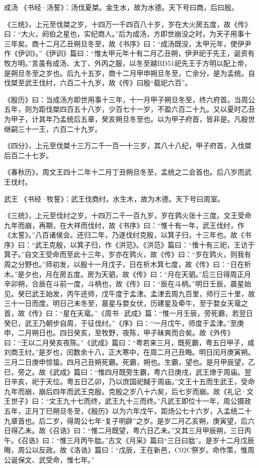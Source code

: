 \documentclass[]{article}
\begin{document}
成汤 《书经·汤誓》：汤伐夏桀。金生水，故为水德。天下号曰商，后曰殷。

《三统》，上元至伐桀之岁，十四万一千四百八十岁，岁在大火房五度，故《传》曰：``大火，阏伯之星也，实纪商人。''后为成汤，方即世崩没之时，为天子用事十三年矣。商十二月乙丑朔旦冬至，故《书序》曰：``成汤既没，太甲元年，使伊尹作《伊训》。''《伊训》篇曰：``惟太甲元年十有二月乙丑朔，伊尹祀于先王，诞资有牧方明。''言虽有成汤、太丁、外丙之服，以冬至越BD51祀先王于方明以配上帝，是朔旦冬至之岁也。后九十五岁，商十二月甲申朔旦冬至，亡余分，是为孟统。自伐桀至武王伐纣，六百二十九岁，故《传》曰殷``载祀六百''。

《殷历》曰：当成汤方即世用事十三年，十一月甲子朔旦冬至，终六府首。当周公五年，则为距伐桀四百五十八岁，少百七十一岁，不盈六百二十九。又以夏时乙丑为甲子，计其年乃孟统后五章，癸亥朔旦冬至也。以为甲子府首，皆非是。凡殷世继嗣三十一王，六百二十九岁。

《四分》，上元至伐桀十三万二千一百一十三岁，其八十八纪，甲子府首，入伐桀后百二十七岁。

《春秋历》，周文王四十二年十二月丁丑朔旦冬至，孟统之二会首也。后八岁而武王伐纣。

武王 《书经·牧誓》：武王伐商纣。水生木，故为木德。天下号曰周室。

《三统》，上元至伐纣之岁，十四万二千一百九岁，岁在鹑火张十三度。文王受命九年而崩，再期，在大祥而伐纣，故《书序》曰：``惟十有一年，武王伐纣，作《太誓》。''八百诸侯会。还归二年，乃遂伐纣克殷，以箕子归，十三年也。故《书序》曰：``武王克殷，以箕子归，作《洪范》。《洪范》篇曰：``惟十有三祀，王访于箕子。''自文王受命而至此十三年，岁亦在鹑火，故《传》曰：``岁在鹑火，则我有周之分野也。''师初发，以殷十一月戊子，日在析木箕七度，故《传》曰：``日在析木。''是夕也，月在房五度。房为天驷，故《传》曰：``月在天驷。''后三日得周正月辛卯朔，合辰在斗前一度，斗柄也，故《传》曰：``辰在斗柄。''明日壬辰，晨星始见。癸巳武王始发，丙午还师，戊午度于孟津。孟津去周九百里，师行三十里，故三十一日而度。明日己未冬至，晨星与婺女伏，历建星及牵牛，至于婺女天鼋之首，故《传》曰：``星在天鼋。''《周书·武成》篇：``惟一月壬辰，旁死霸，若翌日癸巳，武王乃朝步自周，于征伐纣。''《序》曰：``一月戊午，师度于孟津。''至庚申，二月朔日也。四日癸亥，至牧野，夜陈，甲子昧爽而合矣。故《外传》曰：``王以二月癸亥夜陈。''《武成》篇曰：``粤若来三月，既死霸，粤五日甲子，咸刘商王纣。''是岁也，闰数余十八，正大寒中，在周二月己丑晦。明日闰月庚寅朔。三月二日庚申惊蛰。四月己丑朔死霸。死霸，朔也。生霸，望也。是月甲辰望，乙巳，旁之。故《武成》篇曰：``惟四月既旁生霸，粤六日庚戌，武王燎于周庙。翌日辛亥，祀于天位。粤五日乙卯，乃以庶国祀馘于周庙。''文王十五而生武王，受命九年而崩，崩后四年而武王克殷。克殷之岁八十六矣，后七岁而崩。故《礼记·文王世子》曰：``文王九十七而终，武王九十三而终。''凡武王即位十一年，周公摄政五年，正月丁巳朔旦冬至，《殷历》以为六年戊午，距炀公七十六岁，入孟统二十九章首也。后二岁，得周公七年``复子明辟''之岁。是岁二月乙亥朔，庚寅望，后六日得乙未。故《召诰》曰：``惟二月既望，粤六日乙未。''又其三月甲辰朔，三日丙午。《召诰》曰：``惟三月丙午朏。''古文《月采》篇曰``三日曰朏''。是岁十二月戊辰晦，周公以反政。故《洛诰》篇曰：``戊辰，王在新邑，C02C祭岁。命作策，惟周公诞保文、武受命，惟七年。''
\end{document}
